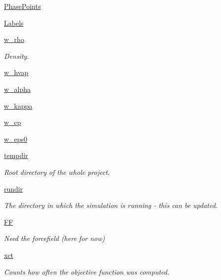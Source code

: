 \begin{DoxyCompactItemize}
\item 
\hyperlink{classforcebalance_1_1liquid_1_1Liquid_a2c10490d9073a069bd19361f386422ef}{Phase\-Points}
\item 
\hyperlink{classforcebalance_1_1liquid_1_1Liquid_a50f976d2d3d6a1c261756035a26390e2}{Labels}
\item 
\hyperlink{classforcebalance_1_1liquid_1_1Liquid_aef8ad1dda086bde6f48130d273af9784}{w\-\_\-rho}
\begin{DoxyCompactList}\small\item\em Density. \end{DoxyCompactList}\item 
\hyperlink{classforcebalance_1_1liquid_1_1Liquid_abe985fe3aaa03d9f3a1b0a90f26b774d}{w\-\_\-hvap}
\item 
\hyperlink{classforcebalance_1_1liquid_1_1Liquid_a0d36d27d8c406b53bbb1096fbb76adbb}{w\-\_\-alpha}
\item 
\hyperlink{classforcebalance_1_1liquid_1_1Liquid_a6b262d9343247a902063bf62d5f19108}{w\-\_\-kappa}
\item 
\hyperlink{classforcebalance_1_1liquid_1_1Liquid_a3809c649d95ac6c9f662d599e6b1b93d}{w\-\_\-cp}
\item 
\hyperlink{classforcebalance_1_1liquid_1_1Liquid_a75ad3ea94ec845e91499f858e7be5f27}{w\-\_\-eps0}
\item 
\hyperlink{classforcebalance_1_1target_1_1Target_aa1f01b5b78db253b5b66384ed11ed193}{tempdir}
\begin{DoxyCompactList}\small\item\em Root directory of the whole project. \end{DoxyCompactList}\item 
\hyperlink{classforcebalance_1_1target_1_1Target_a6872de5b2d4273b82336ea5b0da29c9e}{rundir}
\begin{DoxyCompactList}\small\item\em The directory in which the simulation is running -\/ this can be updated. \end{DoxyCompactList}\item 
\hyperlink{classforcebalance_1_1target_1_1Target_a38a37919783141ea37fdcf8b00ce0aaf}{F\-F}
\begin{DoxyCompactList}\small\item\em Need the forcefield (here for now) \end{DoxyCompactList}\item 
\hyperlink{classforcebalance_1_1target_1_1Target_aad2e385cfbf7b4a68f1c2cb41133fe82}{xct}
\begin{DoxyCompactList}\small\item\em Counts how often the objective function was computed. \end{DoxyCompactList}\item 

\end{DoxyCompactItemize}
